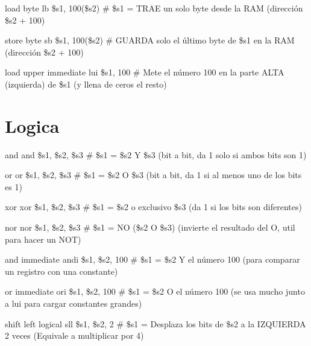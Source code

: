 \documentclass[24pt,letterpaper]{article}
\begin{document}
load byte \hspace{0.60cm} lb \$s1, 100(\$s2) \hspace{0.60cm} \# \$s1 = TRAE un solo byte desde la RAM (dirección \$s2 + 100)

store byte \hspace{0.60cm} sb \$s1, 100(\$s2) \hspace{0.60cm} \# GUARDA solo el último byte de \$s1 en la RAM (dirección \$s2 + 100)

load upper immediate \hspace{0.60cm} lui \$s1, 100 \hspace{0.60cm} \# Mete el número 100 en la parte ALTA (izquierda) de \$s1 (y llena de ceros el resto)

\section{Logica}
and \hspace{0.60cm} and \$s1, \$s2, \$s3 \hspace{0.60cm} \# \$s1 = \$s2 Y \$s3 (bit a bit, da 1 solo si ambos bits son 1)

or \hspace{0.60cm} or \$s1, \$s2, \$s3 \hspace{0.60cm} \# \$s1 = \$s2 O \$s3 (bit a bit, da 1 si al menos uno de los bits es 1)

xor \hspace{0.60cm} xor \$s1, \$s2, \$s3 \hspace{0.60cm} \# \$s1 = \$s2 o exclusivo \$s3 (da 1 si los bits son diferentes)

nor \hspace{0.60cm} nor \$s1, \$s2, \$s3 \hspace{0.60cm} \# \$s1 = NO (\$s2 O \$s3) (invierte el resultado del O, util para hacer un NOT)

and immediate \hspace{0.60cm} andi \$s1, \$s2, 100 \hspace{0.60cm} \# \$s1 = \$s2 Y el número 100 (para comparar un registro con una constante)

or immediate \hspace{0.60cm} ori \$s1, \$s2, 100 \hspace{0.60cm} \# \$s1 = \$s2 O el número 100 (se usa mucho junto a lui para cargar constantes grandes)

shift left logical \hspace{0.60cm} sll \$s1, \$s2, 2 \hspace{0.60cm} \# \$s1 = Desplaza los bits de \$s2 a la IZQUIERDA 2 veces (Equivale a multiplicar por 4)
\end{document}
